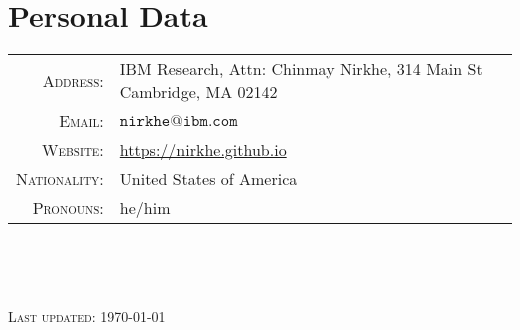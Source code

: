 \documentclass[11pt]{article}
\begin{document}
\section{Personal Data}

\begin{tabular}{rl}
    \textsc{Address:}     & IBM Research, Attn: Chinmay Nirkhe, 314 Main St Cambridge, MA 02142 \\
    \textsc{Email:}       & $\mathtt{nirkhe@ibm.com}$ \\
    \textsc{Website:}     & \url{https://nirkhe.github.io} \\
    \textsc{Nationality:} & United States of America \\
    \textsc{Pronouns:}    & he/him \\
\end{tabular}

\

\

\textsc{Last updated: \today}
\end{document}
